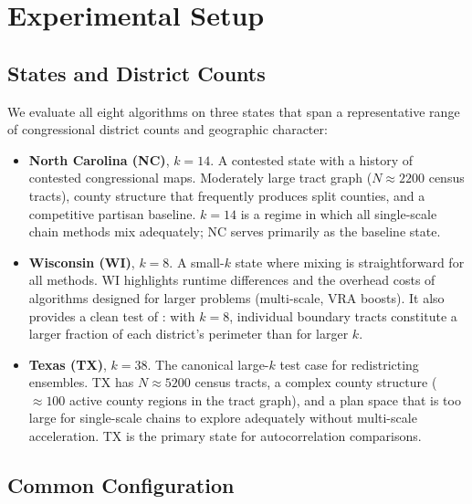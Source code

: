 \section{Experimental Setup}
\label{sec:setup}

\subsection{States and District Counts}

We evaluate all eight algorithms on three states that span a representative
range of congressional district counts and geographic character:

\begin{itemize}
  \item \textbf{North Carolina (NC)}, $k = 14$.
        A contested state with a history of contested congressional maps.
        Moderately large tract graph ($N \approx 2200$ census tracts),
        county structure that frequently produces split counties, and a
        competitive partisan baseline.
        $k = 14$ is a regime in which all single-scale chain methods mix
        adequately; NC serves primarily as the baseline state.

  \item \textbf{Wisconsin (WI)}, $k = 8$.
        A small-$k$ state where mixing is straightforward for all methods.
        WI highlights runtime differences and the overhead costs of
        algorithms designed for larger problems (multi-scale, VRA boosts).
        It also provides a clean test of \flip{}: with $k = 8$, individual
        boundary tracts constitute a larger fraction of each district's
        perimeter than for larger $k$.

  \item \textbf{Texas (TX)}, $k = 38$.
        The canonical large-$k$ test case for redistricting ensembles.
        TX has $N \approx 5200$ census tracts, a complex county structure
        ($\approx 100$ active county regions in the tract graph), and a
        plan space that is too large for single-scale chains to explore
        adequately without multi-scale acceleration.
        TX is the primary state for autocorrelation comparisons.
\end{itemize}

\subsection{Common Configuration}

